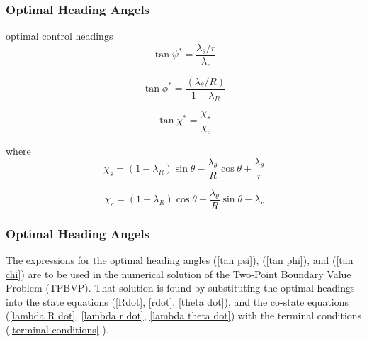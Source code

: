 \documentclass{beamer}
\begin{document}
\begin{frame}
\frametitle{Optimal Heading Angels}
optimal control headings
\begin{equation}
\tan \psi^* = \dfrac{\lambda_\theta / r}{\lambda_r}
\label{tan psi}
\end{equation}

\begin{equation}
\tan \phi^* = \dfrac{(\lambda_\theta/R)}{1- \lambda_R}
\label{tan phi}
\end{equation}

\begin{equation}
\tan \chi^* = \dfrac{\chi_s}{\chi_c}
\label{tan chi}
\end{equation} 

where 
\begin{equation*}
\chi_s = (1-\lambda_R) \sin\theta - \frac{\lambda_\theta}{R} \cos\theta + \frac{\lambda_\theta}{r}
\end{equation*}

\begin{equation*}
\chi_c = (1-\lambda_R) \cos \theta + \frac{\lambda_\theta}{R} \sin \theta - \lambda_r
\end{equation*}
\end{frame}
\begin{frame}
\frametitle{Optimal Heading Angels}
The expressions for the optimal heading angles (\ref{tan psi}), (\ref{tan phi}), and (\ref{tan chi}) are to be used in the numerical solution of the Two-Point Boundary Value Problem (TPBVP). That solution is found by substituting the optimal headings into the state equations (\ref{Rdot}, \ref{rdot}, \ref{theta dot}), and the co-state equations (\ref{lambda R dot}, \ref{lambda r dot}, \ref{lambda theta dot})  with the terminal conditions (\ref{terminal conditions}
).
\end{frame}
\end{document}
